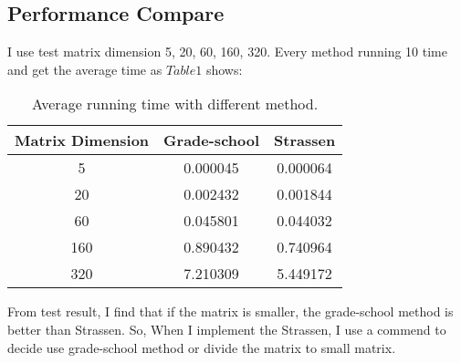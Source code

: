 \documentclass{article}
\begin{document}
    \subsection{Performance Compare}
    I use test matrix dimension 5, 20, 60, 160, 320. Every method running 10 time and get the average time as $Table 1$ shows:
      \begin{table}[tbp]     
            \centering 
                \begin{tabular}{ccc}  
                \hline
                    Matrix Dimension & Grade-school & Strassen  \\ \hline  %
                    5          & 0.000045     & 0.000064  \\
                    20         & 0.002432     & 0.001844  \\
                    60         & 0.045801     & 0.044032  \\
                    160        & 0.890432     & 0.740964  \\
                    320        & 7.210309     & 5.449172  \\ \hline
                \end{tabular}
            \caption{Average running time with different method.}
        \end{table}
    From test result, I find that if the matrix is smaller, the grade-school method is better than Strassen. So, When I implement the Strassen, I use a commend to decide use grade-school method or divide the matrix to small matrix. 
\end{document}
